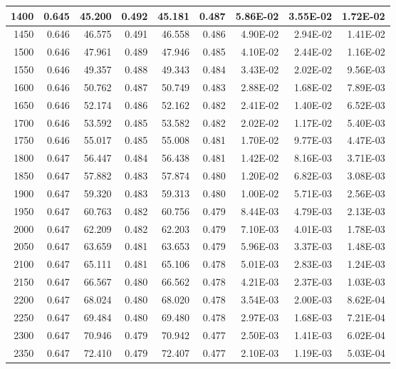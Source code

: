 \begin{table}[htbp]
\begin{tabular}{|r|r|r|r|r|r|r|r|r|}
1400 & 0.645 & 45.200 & 0.492 & 45.181 & 0.487 & 5.86E-02 & 3.55E-02 & 1.72E-02 \\ \hline
1450 & 0.646 & 46.575 & 0.491 & 46.558 & 0.486 & 4.90E-02 & 2.94E-02 & 1.41E-02 \\ \hline
1500 & 0.646 & 47.961 & 0.489 & 47.946 & 0.485 & 4.10E-02 & 2.44E-02 & 1.16E-02 \\ \hline
1550 & 0.646 & 49.357 & 0.488 & 49.343 & 0.484 & 3.43E-02 & 2.02E-02 & 9.56E-03 \\ \hline
1600 & 0.646 & 50.762 & 0.487 & 50.749 & 0.483 & 2.88E-02 & 1.68E-02 & 7.89E-03 \\ \hline
1650 & 0.646 & 52.174 & 0.486 & 52.162 & 0.482 & 2.41E-02 & 1.40E-02 & 6.52E-03 \\ \hline
1700 & 0.646 & 53.592 & 0.485 & 53.582 & 0.482 & 2.02E-02 & 1.17E-02 & 5.40E-03 \\ \hline
1750 & 0.646 & 55.017 & 0.485 & 55.008 & 0.481 & 1.70E-02 & 9.77E-03 & 4.47E-03 \\ \hline
1800 & 0.647 & 56.447 & 0.484 & 56.438 & 0.481 & 1.42E-02 & 8.16E-03 & 3.71E-03 \\ \hline
1850 & 0.647 & 57.882 & 0.483 & 57.874 & 0.480 & 1.20E-02 & 6.82E-03 & 3.08E-03 \\ \hline
1900 & 0.647 & 59.320 & 0.483 & 59.313 & 0.480 & 1.00E-02 & 5.71E-03 & 2.56E-03 \\ \hline
1950 & 0.647 & 60.763 & 0.482 & 60.756 & 0.479 & 8.44E-03 & 4.79E-03 & 2.13E-03 \\ \hline
2000 & 0.647 & 62.209 & 0.482 & 62.203 & 0.479 & 7.10E-03 & 4.01E-03 & 1.78E-03 \\ \hline
2050 & 0.647 & 63.659 & 0.481 & 63.653 & 0.479 & 5.96E-03 & 3.37E-03 & 1.48E-03 \\ \hline
2100 & 0.647 & 65.111 & 0.481 & 65.106 & 0.478 & 5.01E-03 & 2.83E-03 & 1.24E-03 \\ \hline
2150 & 0.647 & 66.567 & 0.480 & 66.562 & 0.478 & 4.21E-03 & 2.37E-03 & 1.03E-03 \\ \hline
2200 & 0.647 & 68.024 & 0.480 & 68.020 & 0.478 & 3.54E-03 & 2.00E-03 & 8.62E-04 \\ \hline
2250 & 0.647 & 69.484 & 0.480 & 69.480 & 0.478 & 2.97E-03 & 1.68E-03 & 7.21E-04 \\ \hline
2300 & 0.647 & 70.946 & 0.479 & 70.942 & 0.477 & 2.50E-03 & 1.41E-03 & 6.02E-04 \\ \hline
2350 & 0.647 & 72.410 & 0.479 & 72.407 & 0.477 & 2.10E-03 & 1.19E-03 & 5.03E-04 \\ \hline

\end{tabular}
\end{table}

